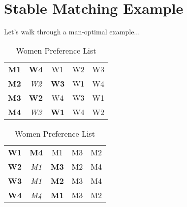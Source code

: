 \documentclass[twoside]{article}
\begin{document}
\section{Stable Matching Example}

Let's walk through a man-optimal example...
\begin{table}[!htb]
    \begin{minipage}{.5\linewidth}
    \caption{Men Preference List}
      \centering
        \begin{tabular}{c | c c c c}
          \hline
          \hline
            \textbf{M1} & \textbf{W4} & W1 & W2 & W3 \\ 
 			\textbf{M2 }& \textit{W2}& \textbf{W3} & W1 & W4 \\  
 			\textbf{M3} &\textbf{ W2} & W4 & W3 & W1 \\ 
  			\textbf{M4} &\textit{ W3 }& \textbf{W1} & W4 & W2 \\ 
        \end{tabular}
    \end{minipage}%
    \begin{minipage}{.5\linewidth}
      \centering
      \caption{Women Preference List}
        \begin{tabular}{c | c c c c}
          \hline
          \hline
            \textbf{W1} & \textbf{M4} & M1 & M3 & M2 \\ 
            \textbf{W2} & \textit{M1} & \textbf{M3} & M2 & M4 \\ 
            \textbf{W3} & \textit{M1} & \textbf{M2} & M3 & M4 \\ 
            \textbf{W4} & \textit{M4} & \textbf{M1} & M3 & M2 \\ 
        \end{tabular}
    \end{minipage} 
\end{table} 
\end{document}
